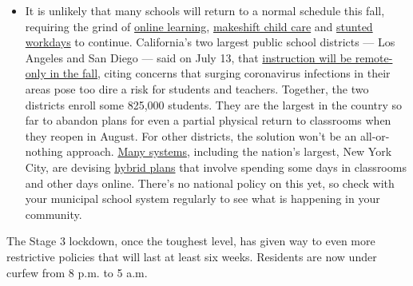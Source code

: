 \begin{itemize}
  \begin{itemize}
  \tightlist
  \item
    It is unlikely that many schools will return to a normal schedule
    this fall, requiring the grind of
    \href{https://www.nytimes3xbfgragh.onion/2020/06/05/us/coronavirus-education-lost-learning.html?action=click\&pgtype=Article\&state=default\&region=MAIN_CONTENT_3\&context=storylines_faq}{online
    learning},
    \href{https://www.nytimes3xbfgragh.onion/2020/05/29/us/coronavirus-child-care-centers.html?action=click\&pgtype=Article\&state=default\&region=MAIN_CONTENT_3\&context=storylines_faq}{makeshift
    child care} and
    \href{https://www.nytimes3xbfgragh.onion/2020/06/03/business/economy/coronavirus-working-women.html?action=click\&pgtype=Article\&state=default\&region=MAIN_CONTENT_3\&context=storylines_faq}{stunted
    workdays} to continue. California's two largest public school
    districts --- Los Angeles and San Diego --- said on July 13, that
    \href{https://www.nytimes3xbfgragh.onion/2020/07/13/us/lausd-san-diego-school-reopening.html?action=click\&pgtype=Article\&state=default\&region=MAIN_CONTENT_3\&context=storylines_faq}{instruction
    will be remote-only in the fall}, citing concerns that surging
    coronavirus infections in their areas pose too dire a risk for
    students and teachers. Together, the two districts enroll some
    825,000 students. They are the largest in the country so far to
    abandon plans for even a partial physical return to classrooms when
    they reopen in August. For other districts, the solution won't be an
    all-or-nothing approach.
    \href{https://bioethics.jhu.edu/research-and-outreach/projects/eschool-initiative/school-policy-tracker/}{Many
    systems}, including the nation's largest, New York City, are
    devising
    \href{https://www.nytimes3xbfgragh.onion/2020/06/26/us/coronavirus-schools-reopen-fall.html?action=click\&pgtype=Article\&state=default\&region=MAIN_CONTENT_3\&context=storylines_faq}{hybrid
    plans} that involve spending some days in classrooms and other days
    online. There's no national policy on this yet, so check with your
    municipal school system regularly to see what is happening in your
    community.
  \end{itemize}
\end{itemize}

The Stage 3 lockdown, once the toughest level, has given way to even
more restrictive policies that will last at least six weeks. Residents
are now under curfew from 8 p.m. to 5 a.m.

